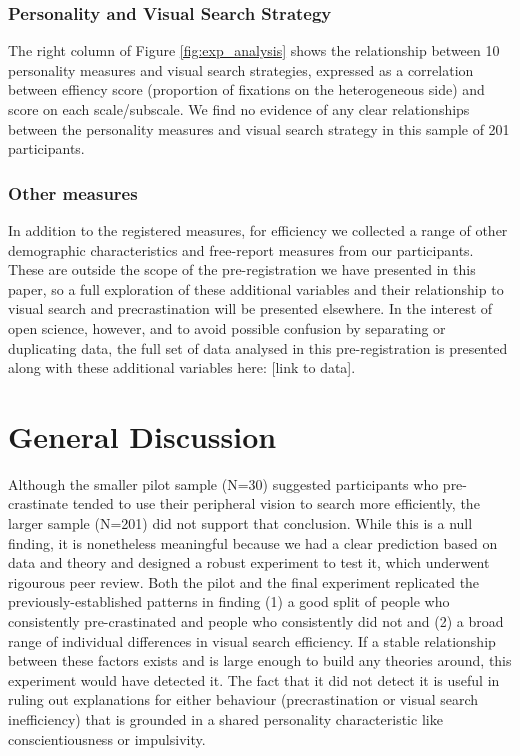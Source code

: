 \documentclass[]{rsos}
\begin{document}
\subsubsection{Personality and Visual Search Strategy}
The right column of Figure \ref{fig:exp_analysis} shows the relationship between 10 personality measures and visual search strategies, expressed as a correlation between effiency score (proportion of fixations on the heterogeneous side) and score on each scale/subscale.  We find no evidence of any clear relationships between the personality measures and visual search strategy in this sample of 201 participants.

\subsubsection{Other measures}

In addition to the registered measures, for efficiency we collected a range of other demographic characteristics and free-report measures from our participants. These are outside the scope of the pre-registration we have presented in this paper, so a full exploration of these additional variables and their relationship to visual search and precrastination will be presented elsewhere. In the interest of open science, however, and to avoid possible confusion by separating or duplicating data, the full set of data analysed in this pre-registration is presented along with these additional variables here: [link to data].

\section{General Discussion}
Although the smaller pilot sample (N=30) suggested participants who pre-crastinate tended to use their peripheral vision to search more efficiently, the larger sample (N=201) did not support that conclusion. While this is a null finding, it is nonetheless meaningful because we had a clear prediction based on data and theory and designed a robust experiment to test it, which underwent rigourous peer review. Both the pilot and the final experiment replicated the previously-established patterns in finding (1) a good split of people who consistently pre-crastinated and people who consistently did not and (2) a broad range of individual differences in visual search efficiency. If a stable relationship between these factors exists and is large enough to build any theories around, this experiment would have detected it. The fact that it did not detect it is useful in ruling out explanations for either behaviour (precrastination or visual search inefficiency) that is grounded in a shared personality characteristic like conscientiousness or impulsivity. 
\end{document}
